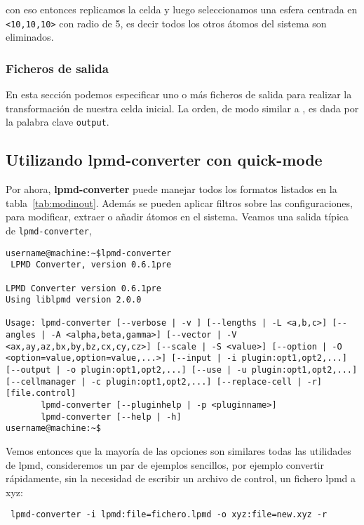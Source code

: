 
con eso entonces replicamos la celda y luego seleccionamos una esfera centrada en \verb|<10,10,10>| con radio de 5, es decir todos los otros \'atomos del sistema son eliminados.

\subsubsection{Ficheros de salida}
En esta secci\'on podemos especificar uno o m\'as ficheros de salida para realizar la transformaci\'on de nuestra celda inicial. La orden, de modo similar a {\lpmd}, es dada por la palabra clave \verb|output|.


\subsection{Utilizando lpmd-converter con quick-mode}
Por ahora, \textbf{lpmd-converter} puede manejar todos los formatos listados en la tabla~\ref{tab:modinout}. Adem\'as se pueden aplicar filtros sobre las configuraciones, para modificar, extraer o a\~nadir \'atomos en el sistema. Veamos una salida t\'ipica de \verb|lpmd-converter|,

\begin{verbatim}
username@machine:~$lpmd-converter
 LPMD Converter, version 0.6.1pre

LPMD Converter version 0.6.1pre
Using liblpmd version 2.0.0

Usage: lpmd-converter [--verbose | -v ] [--lengths | -L <a,b,c>] [--angles | -A <alpha,beta,gamma>] [--vector | -V <ax,ay,az,bx,by,bz,cx,cy,cz>] [--scale | -S <value>] [--option | -O <option=value,option=value,...>] [--input | -i plugin:opt1,opt2,...] [--output | -o plugin:opt1,opt2,...] [--use | -u plugin:opt1,opt2,...] [--cellmanager | -c plugin:opt1,opt2,...] [--replace-cell | -r] [file.control]
       lpmd-converter [--pluginhelp | -p <pluginname>]
       lpmd-converter [--help | -h]
username@machine:~$
\end{verbatim}

Vemos entonces que la mayor\'ia de las opciones son similares todas las utilidades de lpmd, consideremos un par de ejemplos sencillos, por ejemplo convertir r\'apidamente, sin la necesidad de escribir un archivo de control, un fichero lpmd a xyz:

\begin{verbatim}
 lpmd-converter -i lpmd:file=fichero.lpmd -o xyz:file=new.xyz -r
\end{verbatim}

